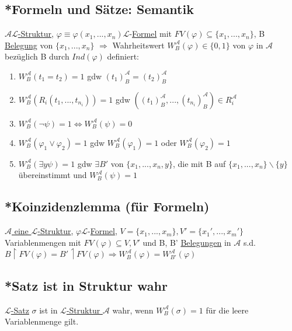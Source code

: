 \documentclass[12pt,a4paper]{article} %
\begin{document}
	\subsection{*Formeln und Sätze: Semantik}
	\hyperref[Struktur]{$\mathcal{A} \mathcal{L}$-Struktur}, $\varphi \equiv \varphi(x_1, ..., x_n) \mathcal{L}$-\hyperref[Formel]{Formel} mit $FV(\varphi) \subseteq \{x_1, ..., x_n\}$, B \hyperref[Belegung]{Belegung} von $\{x_1, ..., x_n\}$ \newline
	$\Rightarrow$ Wahrheitswert $W_B^{\mathcal{A}}(\varphi) \in \{0, 1\}$ von $\varphi$ in $\mathcal{A}$ bezüglich B durch $Ind(\varphi)$ definiert:
	\begin{enumerate}
		\item $W_B^{\mathcal{A}}(t_1 = t_2) = 1$ gdw $(t_1)_B^{\mathcal{A}} = (t_2)_B^{\mathcal{A}}$
		\item $W_B^{\mathcal{A}}(R_i(t_1, ..., t_{n_i})) = 1$ gdw $((t_1)_B^{\mathcal{A}}, ..., (t_{n_i})_B^{\mathcal{A}}) \in R_i^{\mathcal{A}}$
		\item $W_B^{\mathcal{A}}(\neg \psi) = 1 \Leftrightarrow W_B^{\mathcal{A}}(\psi) = 0$
		\item $W_B^{\mathcal{A}}(\varphi_1 \lor \varphi_2) = 1$ gdw $W_B^{\mathcal{A}}(\varphi_1) = 1$ oder $W_B^{\mathcal{A}}(\varphi_2) = 1$
		\item $W_B^{\mathcal{A}}(\exists y \psi) = 1$ gdw $\exists B'$ von $\{x_1, ..., x_n, y\}$, die mit B auf $\{x_1, ..., x_n\} \backslash \{y\}$ übereinstimmt und $W_B^{\mathcal{A}}(\psi) = 1$
	\end{enumerate}

	\subsection{*Koinzidenzlemma (für Formeln)}
	\hyperref[Struktur]{$\mathcal{A}$ eine $\mathcal{L}$-Struktur}, $\varphi \mathcal{L}$-\hyperref[Formel]{Formel}, $V = \{x_1, ..., x_m\}, V' = \{x_1', ..., x_m'\}$ Variablenmengen mit $FV(\varphi) \subseteq V, V'$ und B, B' \hyperref[Belegung]{Belegungen} in $\mathcal{A}$ s.d. $B \upharpoonright FV(\varphi) = B' \upharpoonleft FV(\varphi) \Rightarrow W_B^{\mathcal{A}}(\varphi) = W_{B'}^{\mathcal{A}}(\varphi)$ 
	
	\subsection{*Satz ist in Struktur wahr}
	\hyperref[LSatz]{$\mathcal{L}$-Satz} $\sigma$ ist in \hyperref[Struktur]{$\mathcal{L}$-Struktur $\mathcal{A}$} wahr, wenn $W_B^{\mathcal{A}}(\sigma) = 1$ für die leere Variablenmenge gilt.
	
\end{document}
